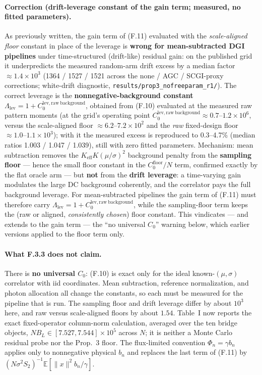 \paragraph{Correction (drift-leverage constant of the gain term; measured, no fitted parameters).} As previously written, the gain term of (F.11) evaluated with the \emph{scale-aligned floor} constant in place of the leverage is \textbf{wrong for mean-subtracted DGI pipelines} under time-structured (drift-like) residual gain: on the published grid it underpredicts the measured random-arm drift excess by a median factor $\approx1.4\times10^3$ (1364 / 1527 / 1521 across the none / AGC / SCGI-proxy corrections; white-drift diagnostic, \texttt{results/prop3\_nofreeparam\_r1/}). The correct leverage is the \textbf{nonnegative-background constant} $\Lambda_{\mathrm{lev}}=1+C_0^{\mathrm{lev,raw\ background}}$, obtained from (F.10) evaluated at the measured raw pattern moments (at the grid's operating point $C_0^{\mathrm{lev,raw\ background}}\approx0.7$--$1.2\times10^6$, versus the scale-aligned floor $\approx6.2$--$7.2\times10^2$ and the \emph{raw} fixed-design floor $\approx1.0$--$1.1\times10^3$); with it the measured excess is reproduced to 0.3--4.7\% (median ratios 1.003 / 1.047 / 1.039), still with zero fitted parameters. Mechanism: mean subtraction removes the $K_{\mathrm{eff}}K(\mu/\sigma)^2$ background penalty from the \textbf{sampling floor} --- hence the small floor constant in the $C_0^{\mathrm{floor}}/N$ term, confirmed exactly by the flat oracle arm --- but \textbf{not} from the \textbf{drift leverage}: a time-varying gain modulates the large DC background coherently, and the correlator pays the full background leverage. For mean-subtracted pipelines the gain term of (F.11) must therefore carry $\Lambda_{\mathrm{lev}}=1+C_0^{\mathrm{lev,raw\ background}}$, while the sampling-floor term keeps the (raw or aligned, \emph{consistently chosen}) floor constant. This vindicates --- and extends to the gain term --- the ``no universal $C_0$'' warning below, which earlier versions applied to the floor term only.

\paragraph{What F.3.3 does not claim.} There is \textbf{no universal $C_0$}: (F.10) is exact only for the ideal known-$(\mu,\sigma)$ correlator with iid coordinates. Mean subtraction, reference normalization, and photon allocation all change the constants, so each must be measured for the pipeline that is run. The sampling floor and drift leverage differ by about $10^3$ here, and raw versus scale-aligned floors by about $1.54$. Table~I now reports the exact fixed-operator column-norm calculation, averaged over the ten bridge objects, $NB_L\in[7.527,7.544]\times10^5$ across $N$; it is neither a Monte Carlo residual probe nor the Prop.~3 floor. The flux-limited convention $\Phi_n=\gamma b_n$ applies only to nonnegative physical $b_n$ and replaces the last term of (F.11) by $(N\sigma^2S_2)^{-1}\mathbb{E}[\|x\|^2 b_n/\gamma]$.


